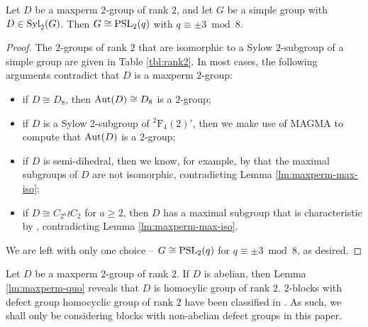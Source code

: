 \documentclass[bysection, amsart]{standard}
\begin{document}
\begin{lemma} \label{lm:sylow-choices}
    Let $D$ be a maxperm $2$-group of rank $2$, and let $G$ be a simple group with $D \in \operatorname{Syl}_2(G)$. Then $G \cong \operatorname{PSL}_2(q)$ with $q \equiv \pm 3 \bmod{8}$.
\end{lemma}
\begin{proof}
    The $2$-groups of rank $2$ that are isomorphic to a Sylow $2$-subgroup of a simple group are given in Table \ref{tbl:rank2}. In most cases, the following arguments contradict that $D$ is a maxperm $2$-group:
    \begin{itemize}
        \item if $D \cong D_8$, then $\operatorname{Aut}(D) \cong D_8$ is a $2$-group;
        \item if $D$ is a Sylow $2$-subgroup of ${^2 \mathrm{F}_4(2)'}$, then we make use of MAGMA \cite{magma} to compute that $\operatorname{Aut}(D)$ is a $2$-group;
        \item if $D$ is semi-dihedral, then we know, for example, by \cite[Exercise 2.1 (9)]{book:primepower} that the maximal subgroups of $D$ are not isomorphic, contradicting Lemma \ref{lm:maxperm-max-iso};
        \item if $D \cong C_{2^a} \wr C_2$ for $a \geq 2$, then $D$ has a maximal subgroup that is characteristic by \cite[Theorem 9.12]{paper:wreath-products}, contradicting Lemma \ref{lm:maxperm-max-iso}.
    \end{itemize}
    We are left with only one choice -- $G \cong \operatorname{PSL}_2(q)$ for $q \equiv \pm 3 \bmod{8}$, as desired.
\end{proof}



Let $D$ be a maxperm $2$-group of rank $2$. If $D$ is abelian, then Lemma \ref{lm:maxperm-quo} reveals that $D$ is homocylic group of rank $2$. $2$-blocks with defect group homocyclic group of rank $2$ have been classified in \cite{paper:hom-rank-2}. As such, we shall only be considering blocks with non-abelian defect groups in this paper.
\end{document}
